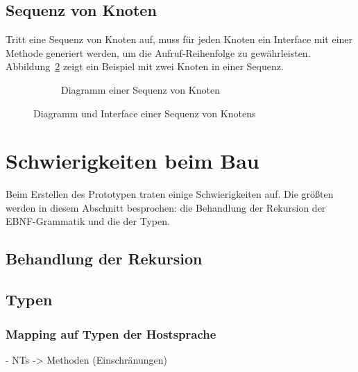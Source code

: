 \documentclass[../InterneDSLs.tex]{subfiles}
\begin{document}
\subsection{Sequenz von Knoten}
Tritt eine Sequenz von Knoten auf, muss für jeden Knoten ein Interface mit einer Methode generiert werden, um die Aufruf-Reihenfolge zu gewährleisten. Abbildung~\ref{FIG:SequenceNode} zeigt ein Beispiel mit zwei Knoten in einer Sequenz.
\begin{figure}[ht]
\centering
  \begin{subfigure}[c]{0.49\textwidth}
    \caption{Diagramm einer Sequenz von Knoten}
    \label{FIG:DiagramSequenceNode}
  \end{subfigure}
  \begin{subfigure}[c]{0.49\textwidth}
    
  \end{subfigure}
  \caption{Diagramm und Interface einer Sequenz von Knotens}
  \label{FIG:SequenceNode}
\end{figure}


\section{Schwierigkeiten beim Bau}
Beim Erstellen des Prototypen traten einige Schwierigkeiten auf. Die größten werden in diesem Abschnitt besprochen: die Behandlung der Rekursion der EBNF-Grammatik und die der Typen.

\subsection{Behandlung der Rekursion}

\subsection{Typen}

\subsubsection{Mapping auf Typen der Hostsprache}
- NTs -> Methoden (Einschränungen)
\end{document}
